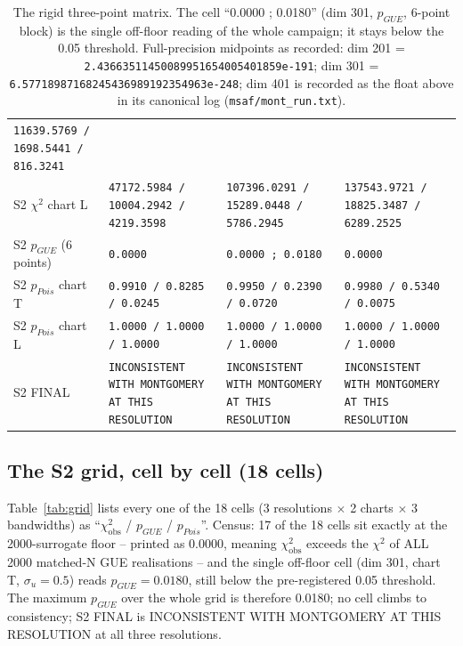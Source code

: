\documentclass[11pt]{article}
\begin{document}
\begin{table}[htbp]
\begin{tabular}{@{}l p{3.4cm} p{3.4cm} p{3.4cm}@{}}
\texttt{11639.5769 / 1698.5441 / 816.3241} \\
S2 $\chi^2$ chart L & \texttt{47172.5984 / 10004.2942 / 4219.3598} &
\texttt{107396.0291 / 15289.0448 / 5786.2945} &
\texttt{137543.9721 / 18825.3487 / 6289.2525} \\
S2 $p_{GUE}$ (6 points) & \texttt{0.0000} &
\texttt{0.0000 ; 0.0180} & \texttt{0.0000} \\
S2 $p_{Pois}$ chart T & \texttt{0.9910 / 0.8285 / 0.0245} &
\texttt{0.9950 / 0.2390 / 0.0720} & \texttt{0.9980 / 0.5340 / 0.0075} \\
S2 $p_{Pois}$ chart L & \texttt{1.0000 / 1.0000 / 1.0000} &
\texttt{1.0000 / 1.0000 / 1.0000} & \texttt{1.0000 / 1.0000 / 1.0000} \\
S2 FINAL & \texttt{INCONSISTENT WITH MONTGOMERY AT THIS RESOLUTION} &
\texttt{INCONSISTENT WITH MONTGOMERY AT THIS RESOLUTION} &
\texttt{INCONSISTENT WITH MONTGOMERY AT THIS RESOLUTION} \\
\bottomrule
\end{tabular}
\caption{The rigid three-point matrix. The cell ``0.0000 ; 0.0180''
(dim 301, $p_{GUE}$, 6-point block) is the single off-floor reading of
the whole campaign; it stays below the 0.05 threshold. Full-precision
midpoints as recorded: dim 201 =
\texttt{2.43663511450089951654005401859e-191}; dim 301 =
\texttt{6.57718987168245436989192354963e-248}; dim 401 is recorded as
the float above in its canonical log (\texttt{msaf/mont\_run.txt}).}
\label{tab:matrix}
\end{table}

\subsection{The S2 grid, cell by cell (18 cells)}
Table~\ref{tab:grid} lists every one of the 18 cells
(3 resolutions $\times$ 2 charts $\times$ 3 bandwidths) as
``$\chi^2_{\mathrm{obs}}$ / $p_{GUE}$ / $p_{Pois}$''. Census: 17 of the
18 cells sit exactly at the 2000-surrogate floor -- printed as 0.0000,
meaning $\chi^2_{\mathrm{obs}}$ exceeds the $\chi^2$ of ALL 2000
matched-N GUE realisations -- and the single off-floor cell (dim 301,
chart T, $\sigma_u = 0.5$) reads $p_{GUE} = 0.0180$, still below the
pre-registered 0.05 threshold. The maximum $p_{GUE}$ over the whole
grid is therefore 0.0180; no cell climbs to consistency; S2 FINAL is
INCONSISTENT WITH MONTGOMERY AT THIS RESOLUTION at all three
resolutions.
\end{document}
